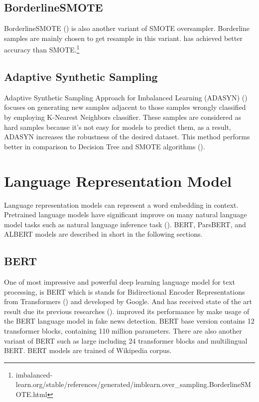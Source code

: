 \subsection{BorderlineSMOTE} 
BorderlineSMOTE (\cite{borderlinesmothe}) is also another variant of SMOTE oversampler. Borderline samples are mainly chosen to get resample in this variant. \cite{borderlinesmothe} has achieved better accuracy than SMOTE.\footnote{imbalanced-learn.org/stable/references/generated/imblearn.over\_sampling.BorderlineSMOTE.html}
\subsection{Adaptive Synthetic Sampling} 
Adaptive Synthetic Sampling Approach for Imbalanced Learning (\ac{ADASYN}) (\cite{adasyn}) focuses on generating new samples adjacent to those samples wrongly classified by employing K-Nearest Neighbors classifier. These samples are considered as hard samples because it's not easy for models to predict them, as a result, \ac{ADASYN} increases the robustness of the desired dataset. This method performs better in comparison to Decision Tree and SMOTE algorithms (\cite{adasyn}).

\section{Language Representation Model}
\label{lr:lm}
Language representation models can represent a word embedding in context. Pretrained language models have significant improve on many natural language model tasks such as natural language inference task (\cite{bert}). \ac{BERT}, \ac{ParsBERT}, and \ac{ALBERT} models are described in short in the following sections.
\subsection{BERT}
One of most impressive and powerful deep learning language model for text processing, is \ac{BERT} which is stands for Bidirectional Encoder
Representations from Transformers (\cite{bert}) and developed by Google. And has received state of the art result due its previous researches (\cite{bert}). \cite{spotfake} improved its performance by make usage of the \ac{BERT} language model in fake news detection. \ac{BERT} base version contains 12 transformer blocks, containing 110 million parameters. There are also another variant of \ac{BERT} such as large including 24 transformer blocks and multilingual \ac{BERT}. \ac{BERT} models are trained of Wikipedia corpus. 

